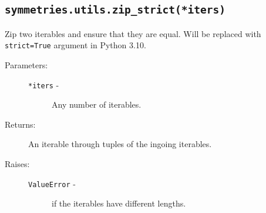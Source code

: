 \subsection*{\lstinline{symmetries.utils.zip_strict(*iters)}}

   Zip two iterables and ensure that they are equal. Will be replaced
   with \lstinline{strict=True} argument in Python 3.10.

   \begin{description}
      \item[Parameters:] \leavevmode
        \begin{description}
          \item[\lstinline{*iters} -] Any number of iterables.
        \end{description}
      \item[Returns:] An iterable through tuples of the ingoing iterables.
      \item[Raises:] \leavevmode
      \begin{description}
        \item[\lstinline{ValueError} -] if the iterables have different lengths.
      \end{description}
   \end{description}     
